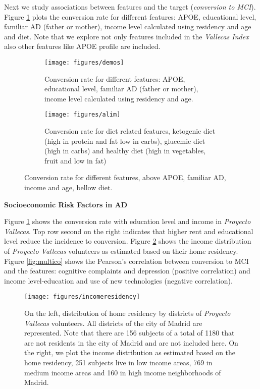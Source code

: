 \documentclass[11pt]{article}
\theoremstyle{definition}
\theoremstyle{remark}
\begin{document}
Next we study associations between features and the target (\emph{conversion to MCI}). 
Figure \ref{fig:demosalime} plots the conversion rate for different features: APOE, educational level, familiar AD (father or mother), income level calculated using residency and age and diet. Note that we explore not only features included in the \emph{Vallecas Index} also other features like APOE profile are included. 

\begin{figure}[H]
    \centering
    \begin{subfigure}[t]{\textwidth}
        \centering
        \texttt{[image: figures/demos]}
        \caption{Conversion rate for different features: APOE, educational level, familiar AD (father or mother), income level calculated using residency and age.}

    \end{subfigure}
    
    \begin{subfigure}[t]{\textwidth}
        \centering
        \texttt{[image: figures/alim]}
        \caption{Conversion rate for diet related features, ketogenic diet (high in protein and fat low in carbs), glucemic diet (high in carbs) and healthy diet (high in vegetables, fruit and low in fat)}
    \end{subfigure}%
    \caption{Conversion rate for different features, above APOE, familiar AD, income and age, bellow diet.} \label{fig:demosalime}
\end{figure}

\textbf{Socioeconomic Risk Factors in AD}

Figure \ref{fig:demosalime} shows the conversion rate with education level and income in \emph{Proyecto Vallecas}. Top row second on the right indicates that higher rent and educational level reduce the incidence to conversion.
Figure \ref{fig:incomeresidency} shows the income distribution of \emph{Proyecto Vallecas} volunteers as estimated based on their home residency. Figure \ref{fig:multico} shows the Pearson's correlation between conversion to MCI and the features: cognitive complaints and depression (positive correlation) and income level-education and use of new technologies (negative correlation).

\begin{figure}[H]
        \centering
        \texttt{[image: figures/incomeresidency]}
        \caption{On the left, distribution of home residency by districts of \emph{Proyecto Vallecas} volunteers. All districts of the city of Madrid are represented. Note that there are 156 subjects of a total of 1180 that are not residents in the city of Madrid and are not included here. On the right, we plot the income distribution as estimated based on the home residency, 251 subjects live in low income areas, 769 in medium income areas and 160 in high income neighborhoods of Madrid.
        } \label{fig:incomeresidency}
\end{figure}
\end{document}
